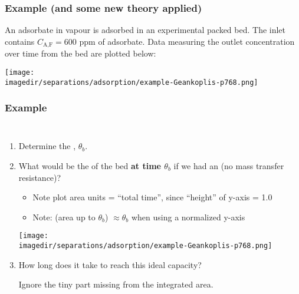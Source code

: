 \begin{frame}\frametitle{Example (and some new theory applied)}
	An adsorbate in vapour is adsorbed in an experimental packed bed. The inlet contains $C_\text{A,F} = 600$ ppm of adsorbate. Data measuring the outlet concentration over time from the bed are plotted below:

	\begin{center}
		\texttt{[image: \\imagedir/separations/adsorption/example-Geankoplis-p768.png]}
	\end{center}
	\vspace{-24pt}
\end{frame}

\begin{frame}\frametitle{Example}
	\vspace{-12pt}
	\begin{columns}[t]
		\begin{enumerate}
			\item	Determine the {\color{purple}{breakthrough time}}, $\theta_b$. \pause \iftoggle{instructor}{[{\color{myOrange}{\small Ans: 3.65 hours}}]}{}
			\item	What would be the {\color{purple}{usable capacity}} of the bed \textbf{at time $\theta_b$} if we had an {\color{purple}{ideal wavefront}} (no mass transfer resistance)? \pause \iftoggle{instructor}{[{\color{myOrange}{Ans:}} the fractional area of $A_1$ = 3.65 / 6.9 = {\color{orange}{53\%}}]}{}
			\pause
				\begin{itemize}
					\item	Note plot area units = ``total time'', since ``height'' of y-axis = 1.0
					\item	Note: (area up to $\theta_b$) $\approx \theta_b$  when using a normalized y-axis
				\end{itemize}
			\begin{center}
				\texttt{[image: \\imagedir/separations/adsorption/example-Geankoplis-p768.png]}
			\end{center}
			\vspace{-6pt}
			\item	How long does it take to reach this ideal capacity? {}%

			\vspace{-4pt}
			{\tiny Ignore the tiny part missing from the integrated area.}
		\end{enumerate}
	\end{columns}
\end{frame}

